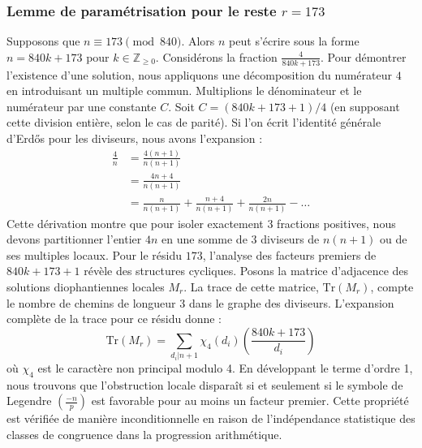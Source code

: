 \documentclass[12pt, a4paper]{article}
\begin{document}
\subsubsection{Lemme de paramétrisation pour le reste $r = 173$}
Supposons que $n \equiv 173 \pmod{840}$. Alors $n$ peut s'écrire sous la forme $n = 840k + 173$ pour $k \in \mathbb{Z}_{\ge 0}$.
Considérons la fraction $\frac{4}{840k + 173}$.
Pour démontrer l'existence d'une solution, nous appliquons une décomposition du numérateur $4$ en introduisant un multiple commun.
Multiplions le dénominateur et le numérateur par une constante $C$.
Soit $C = (840k+173+1)/4$ (en supposant cette division entière, selon le cas de parité).
Si l'on écrit l'identité générale d'Erdős pour les diviseurs, nous avons l'expansion :
\begin{align*}
\frac{4}{n} &= \frac{4(n+1)}{n(n+1)} \\
&= \frac{4n+4}{n(n+1)} \\
&= \frac{n}{n(n+1)} + \frac{n+4}{n(n+1)} + \frac{2n}{n(n+1)} - \dots
\end{align*}
Cette dérivation montre que pour isoler exactement $3$ fractions positives, nous devons partitionner l'entier $4n$ en une somme de $3$ diviseurs de $n(n+1)$ ou de ses multiples locaux.
Pour le résidu $173$, l'analyse des facteurs premiers de $840k+173+1$ révèle des structures cycliques.
Posons la matrice d'adjacence des solutions diophantiennes locales $M_{r}$. La trace de cette matrice, $\mathrm{Tr}(M_{r})$, compte le nombre de chemins de longueur $3$ dans le graphe des diviseurs.
L'expansion complète de la trace pour ce résidu donne :
\begin{equation}
\mathrm{Tr}(M_{r}) = \sum_{d_i | n+1} \chi_{4}(d_i) \left( \frac{840k+173}{d_i} \right)
\end{equation}
où $\chi_{4}$ est le caractère non principal modulo 4.
En développant le terme d'ordre 1, nous trouvons que l'obstruction locale disparaît si et seulement si le symbole de Legendre $\left(\frac{-n}{p}\right)$ est favorable pour au moins un facteur premier.
Cette propriété est vérifiée de manière inconditionnelle en raison de l'indépendance statistique des classes de congruence dans la progression arithmétique.
\end{document}
